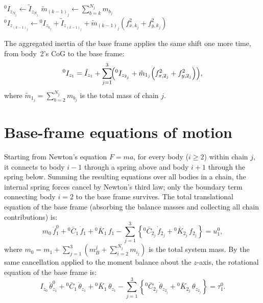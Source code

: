 \documentclass[11pt,letterpaper]{article}
\begin{document}
\begin{algorithm}[H]
\caption{Planar inertia aggregation for the $j$-th chain.}
\begin{algorithmic}[1]
\State $^0I_{z_{N_j}} \leftarrow \tilde{I}_{z_{N_j}}$
        \State $\tilde{m}_{(k-1)_j} \leftarrow \sum_{b=k}^{N_j} m_{b_j}$
        \State $^0I_{z_{(k-1)_j}} \leftarrow {}^0I_{z_{k_j}} + \tilde{I}_{z_{(k-1)_j}} + \tilde{m}_{(k-1)_j}\!\left(f_{x,k_j}^2 + f_{y,k_j}^2\right)$
    \EndFor
\EndIf
\end{algorithmic}
\end{algorithm}

The aggregated inertia of the base frame applies the same shift one more time, from body~2's CoG to the base frame:
\begin{equation}
    {}^0I_{z_1} = \tilde{I}_{z_1}
    + \sum_{j=1}^{3}\!\Bigl({}^0I_{z_{2_j}}
      + \tilde{m}_{1_j}\!\left(f_{x,2_j}^2 + f_{y,2_j}^2\right)\Bigr),
\end{equation}
where $\tilde{m}_{1_j} = \sum_{b=2}^{N_j} m_{b_j}$ is the total mass of chain $j$.

\section*{Base-frame equations of motion}

Starting from Newton's equation $F=ma$, for every body ($i\geq 2$) within chain $j$, it connects to body $i-1$ through a spring above and body $i+1$ through the spring below. Summing the resulting equations over all bodies in a chain, the internal spring forces cancel by Newton's third law; only the boundary term connecting body $i=2$ to the base frame survives. The total translational equation of the base frame (absorbing the balance masses and collecting all chain contributions) is:
\begin{equation}
    m_0\,\ddot{f}^{0}_{1}
    + {}^0\bar{C}_1\,\dot{f}_1
    + {}^0\bar{K}_1\,f_1
    - \sum_{j=1}^{3}\!\left\{
        {}^0\bar{C}_{2_j}\,\dot{f}_{2_j} + {}^0\bar{K}_{2_j}\,f_{2_j}
    \right\} = u^0_{1},
\end{equation}
where $m_0 = m_{1} + \sum_{j=1}^{3}\!\left(m^j_{B} + \sum_{i=2}^{N_j} m_{i_j}\right)$ is the total system mass. By the same cancellation applied to the moment balance about the $z$-axis, the rotational equation of the base frame is:
\begin{equation}
    I_{z_0}\,\ddot{\theta}^{0}_{z_1}
    + {}^0\bar{C}_1\,\dot{\theta}_{z_1}
    + {}^0\bar{K}_1\,\theta_{z_1}
    - \sum_{j=1}^{3}\!\left\{
        {}^0\bar{C}_{2_j}\,\dot{\theta}_{z_{2_j}}
        + {}^0\bar{K}_{2_j}\,\theta_{z_{2_j}}
    \right\} = \tau^0_{1}.
\end{equation}
\end{document}
